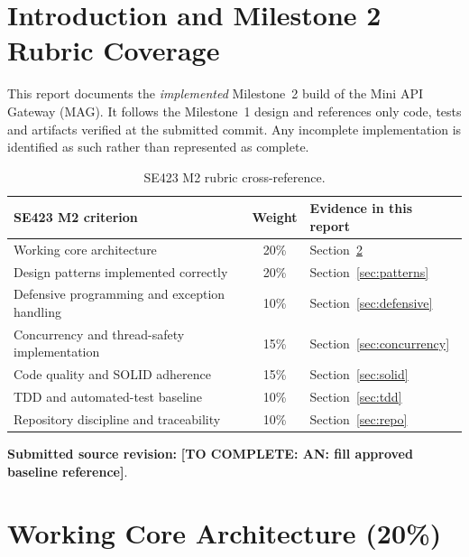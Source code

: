 \documentclass[12pt,a4paper]{article}
\newcommand{\todo}[1]{\textcolor{red!70!black}{\textbf{[TO COMPLETE: #1]}}}
\begin{document}
\section{Introduction and Milestone 2 Rubric Coverage}
This report documents the \emph{implemented} Milestone~2 build of the Mini API Gateway (MAG). It follows the Milestone~1 design and references only code, tests and artifacts verified at the submitted commit. Any incomplete implementation is identified as such rather than represented as complete.
\begin{table}[H]\centering\small
\begin{tabular}{L{6cm} c L{5.2cm}}\toprule
\textbf{SE423 M2 criterion} & \textbf{Weight} & \textbf{Evidence in this report}\\\midrule
Working core architecture & 20\% & Section~\ref{sec:core}\\
Design patterns implemented correctly & 20\% & Section~\ref{sec:patterns}\\
Defensive programming and exception handling & 10\% & Section~\ref{sec:defensive}\\
Concurrency and thread-safety implementation & 15\% & Section~\ref{sec:concurrency}\\
Code quality and SOLID adherence & 15\% & Section~\ref{sec:solid}\\
TDD and automated-test baseline & 10\% & Section~\ref{sec:tdd}\\
Repository discipline and traceability & 10\% & Section~\ref{sec:repo}\\\bottomrule
\end{tabular}\caption{SE423 M2 rubric cross-reference.}\end{table}
\textbf{Submitted source revision:} \todo{AN: fill approved baseline reference}.

\section{Working Core Architecture (20\%)}\label{sec:core}
\end{document}
